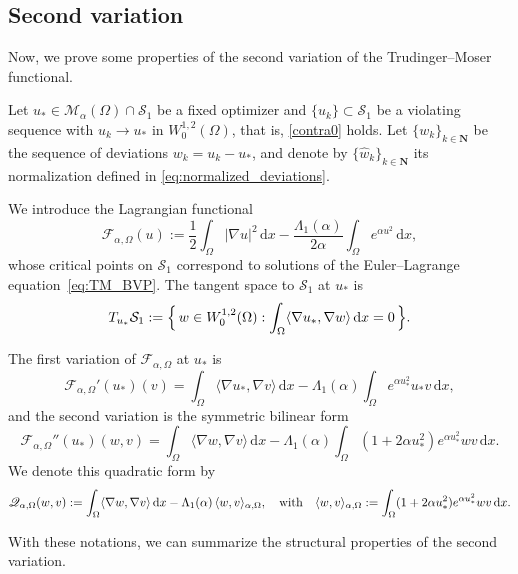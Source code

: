 \documentclass[reqno,11pt]{amsart}
\theoremstyle{definition}
\newcommand{\ud}{\,\mathrm{d}}
\begin{document}
\subsection{Second variation}\label{subsec:second_variation}

Now, we prove some properties of the second variation of the Trudinger--Moser functional.

Let $u_*\in\mathcal{M}_\alpha(\Omega)\cap\mathcal{S}_1$ be a fixed optimizer and
$\{u_k\}\subset\mathcal{S}_1$ be a violating sequence with $u_k\to u_*$ in
$W^{1,2}_0(\Omega)$, that is, \eqref{contra0} holds. Let $\{w_k\}_{k\in\mathbf{N}}$ be the sequence of deviations $w_k=u_k-u_*$, and denote by $\{\widehat{w}_k\}_{k\in\mathbf{N}}$ its normalization defined in \eqref{eq:normalized_deviations}.

We introduce the Lagrangian functional
\begin{equation}\label{eq:Lagrangian}
\mathscr{F}_{\alpha,\Omega}(u)
:=\frac{1}{2}\int_{\Omega}|\nabla u|^2\ud x
-\frac{\Lambda_1(\alpha)}{2\alpha}\int_{\Omega}e^{\alpha u^2}\ud x,
\end{equation}
whose critical points on $\mathcal{S}_1$ correspond to solutions of the
Euler--Lagrange equation~\eqref{eq:TM_BVP}.
The tangent space to $\mathcal{S}_1$ at $u_*$ is
\[
T_{u_*}\mathcal{S}_1
:=\Bigl\{\,w\in W^{1,2}_0(\Omega):
\int_\Omega\langle \nabla u_*,\nabla w\rangle \ud x=0\,\Bigr\}.
\]

The first variation of $\mathscr{F}_{\alpha,\Omega}$ at $u_*$ is
\[
\mathscr{F}_{\alpha,\Omega}'(u_*)(v)
=\int_{\Omega}\langle \nabla u_*,\nabla v\rangle \ud x
-\Lambda_1(\alpha)\int_{\Omega}e^{\alpha u_*^2}u_*v\ud x,
\]
and the second variation is the symmetric bilinear form
\[
\mathscr{F}_{\alpha,\Omega}''(u_*)(w,v)
=\int_{\Omega}\langle \nabla w,\nabla v\rangle \ud x
-\Lambda_1(\alpha)\int_{\Omega}(1+2\alpha u_*^2)
e^{\alpha u_*^2}wv\ud x.
\]
We denote this quadratic form by
\begin{equation}\label{eq:weighted-ip}
\mathscr{Q}_{\alpha,\Omega}(w,v)
:=\int_\Omega\langle \nabla w,\nabla v\rangle \ud x
-\Lambda_1(\alpha)\,\langle w,v\rangle_{\alpha,\Omega},
\quad {\rm with} \quad
\langle w,v\rangle_{\alpha,\Omega}
:=\int_\Omega(1+2\alpha u_*^2)e^{\alpha u_*^2}wv\ud x.
\end{equation}

With these notations, we can summarize the structural properties of the second variation.
\end{document}
